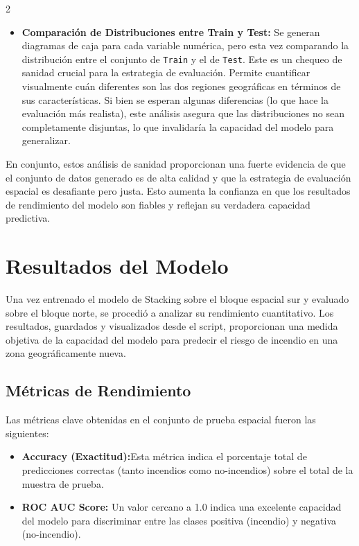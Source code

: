 \documentclass[a4paper,10pt]{article}
\begin{document}
\begin{multicols}{2}
\begin{itemize}
    \item \textbf{Comparación de Distribuciones entre Train y Test:} Se generan diagramas de caja para cada variable numérica, pero esta vez comparando la distribución entre el conjunto de \texttt{Train} y el de \texttt{Test}. Este es un chequeo de sanidad crucial para la estrategia de evaluación. Permite cuantificar visualmente cuán diferentes son las dos regiones geográficas en términos de sus características. Si bien se esperan algunas diferencias (lo que hace la evaluación más realista), este análisis asegura que las distribuciones no sean completamente disjuntas, lo que invalidaría la capacidad del modelo para generalizar.
\end{itemize}

En conjunto, estos análisis de sanidad proporcionan una fuerte evidencia de que el conjunto de datos generado es de alta calidad y que la estrategia de evaluación espacial es desafiante pero justa. Esto aumenta la confianza en que los resultados de rendimiento del modelo son fiables y reflejan su verdadera capacidad predictiva.


\section{Resultados del Modelo}
Una vez entrenado el modelo de Stacking sobre el bloque espacial sur y evaluado sobre el bloque norte, se procedió a analizar su rendimiento cuantitativo. Los resultados, guardados y visualizados desde el script, proporcionan una medida objetiva de la capacidad del modelo para predecir el riesgo de incendio en una zona geográficamente nueva.

\subsection{Métricas de Rendimiento}
Las métricas clave obtenidas en el conjunto de prueba espacial fueron las siguientes:

\begin{itemize}
    \item \textbf{Accuracy (Exactitud):}Esta métrica indica el porcentaje total de predicciones correctas (tanto incendios como no-incendios) sobre el total de la muestra de prueba.
    
    \item \textbf{ROC AUC Score:} Un valor cercano a 1.0 indica una excelente capacidad del modelo para discriminar entre las clases positiva (incendio) y negativa (no-incendio).
\end{itemize}


\end{multicols}
\end{document}
